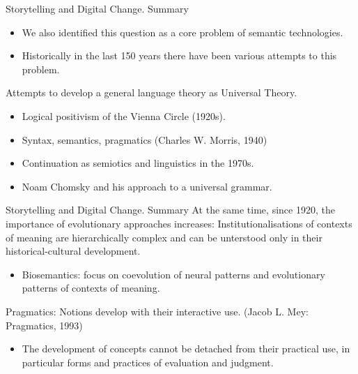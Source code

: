 \documentclass{beamer}
\begin{document}
\begin{frame}{Storytelling and Digital Change. Summary}
\begin{itemize}
\item We also identified this question as a core problem of semantic
  technologies.
\item Historically in the last 150 years there have been various attempts to
  this problem.
\end{itemize}

Attempts to develop a general language theory as Universal Theory.
\begin{itemize}
\item Logical positivism of the Vienna Circle (1920s).
\item Syntax, semantics, pragmatics (Charles W. Morris, 1940)
\item Continuation as semiotics and linguistics in the 1970s.
\item Noam Chomsky and his approach to a universal grammar.
\end{itemize}
\end{frame}

\begin{frame}{Storytelling and Digital Change. Summary}
At the same time, since 1920, the importance of evolutionary approaches
increases: Institutionalisations of contexts of meaning are hierarchically
complex and can be unterstood only in their historical-cultural development.
\begin{itemize}
\item Biosemantics: focus on coevolution of neural patterns and evolutionary
  patterns of contexts of meaning.
\end{itemize}
Pragmatics: Notions develop with their interactive use.  (Jacob L. Mey:
Pragmatics, 1993)
\begin{itemize}
\item The development of concepts cannot be detached from their practical use,
  in particular forms and practices of evaluation and judgment.
\end{itemize}
\end{frame}
\end{document}
